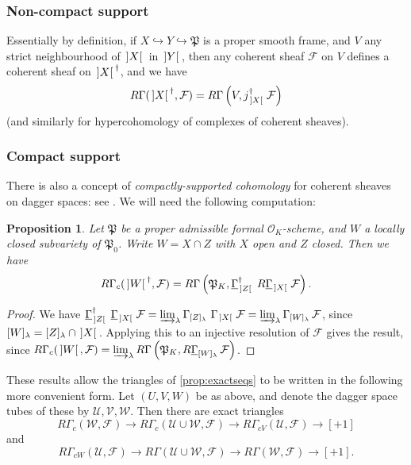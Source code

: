 \documentclass[cjm]{ipart}
\theoremstyle{plain}
\newtheorem{proposition}[theorem]{Proposition}
\theoremstyle{remark}
\DeclarePairedDelimiter{\tb}{{\,]}}{{[\, }} %
\newcommand{\cF}{\mathcal{F}}
\newcommand{\cO}{\mathcal{O}}
\newcommand{\cU}{\mathcal{U}}
\newcommand{\cV}{\mathcal{V}}
\newcommand{\cW}{\mathcal{W}}
\newcommand{\fP}{\mathfrak{P}}
\newcommand{\into}{\hookrightarrow}
\newcommand{\uGa}{\underline{\Gamma}}
\numberwithin{equation}{subsection}
\begin{document}
  \subsubsection{Non-compact support}

   Essentially by definition, if $X \into Y \into \fP$ is a proper smooth frame, and $V$ any strict neighbourhood of $\tb{X}$ in $\tb{Y}$, then any coherent sheaf $\cF$ on $V$ defines a coherent sheaf on $\tb{X}^\dagger$, and we have
   \[ R\Gamma(\tb{X}^\dag, \cF) = R\Gamma\left(V, j_{\tb{X}}^\dag\, \cF\right) \]
   (and similarly for hypercohomology of complexes of coherent sheaves).

  \subsubsection{Compact support}

   There is also a concept of \emph{compactly-supported cohomology} for coherent sheaves on dagger spaces: see \cite[\S 4.3]{grossekloenne00}. We will need the following computation:

   \begin{proposition}
    \label{prop:daggerspace}
    Let $\fP$ be a proper admissible formal $\cO_K$-scheme, and $W$ a locally closed subvariety of $\fP_0$. Write $W = X \cap Z$ with $X$ open and $Z$ closed. Then we have
    \[ R\Gamma_c(\tb{W}^\dagger, \cF) = R\Gamma\left(\fP_K, \uGa^\dag_{\tb{Z}}\ R\uGa_{\tb{X}}\, \cF\right).\]
   \end{proposition}

   \begin{proof}
    We have $\uGa^\dag_{\tb{Z}}\ \uGa_{\tb{X}}\, \cF = \varinjlim_{\lambda} \Gamma_{[Z]_\lambda}\ \Gamma_{\tb{X}}\, \cF = \varinjlim_{\lambda}\Gamma_{[W]_\lambda}\, \cF$, since $[W]_\lambda = [Z]_\lambda \cap \tb{X}$. Applying this to an injective resolution of $\cF$ gives the result, since $R\Gamma_c(\tb{W}, \cF) = \varinjlim_\lambda R\Gamma\left(\fP_K, R\uGa_{[W]_\lambda}\, \cF\right)$.
   \end{proof}

   These results allow the triangles of \cref{prop:exactseqs} to be written in the following more convenient form. Let $(U, V, W)$ be as above, and denote the dagger space tubes of these by $\cU, \cV, \cW$. Then there are exact triangles
   \[
    R\Gamma_c\left(\cW,\cF\right) \to
    R\Gamma_c\left(\cU \cup \cW,\cF\right) \to
    R\Gamma_{cV}\left(\cU, \cF\right) \to [+1]
   \]
   and
   \[ R\Gamma_{cW}(\cU, \cF) \to R\Gamma\left(\cU \cup \cW, \cF\right) \to R\Gamma\left(\cW, \cF\right) \to [+1]. \]
\end{document}
